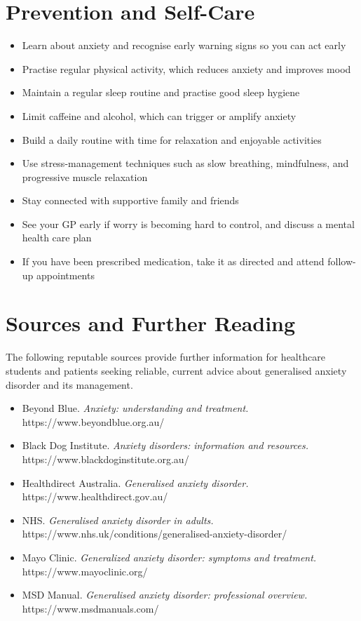 \section*{Prevention and Self-Care}
\begin{itemize}
    \item Learn about anxiety and recognise early warning signs so you can act early
    \item Practise regular physical activity, which reduces anxiety and improves mood
    \item Maintain a regular sleep routine and practise good sleep hygiene
    \item Limit caffeine and alcohol, which can trigger or amplify anxiety
    \item Build a daily routine with time for relaxation and enjoyable activities
    \item Use stress-management techniques such as slow breathing, mindfulness, and progressive muscle relaxation
    \item Stay connected with supportive family and friends
    \item See your GP early if worry is becoming hard to control, and discuss a mental health care plan
    \item If you have been prescribed medication, take it as directed and attend follow-up appointments
\end{itemize}

\section*{Sources and Further Reading}
The following reputable sources provide further information for healthcare students and patients seeking reliable, current advice about generalised anxiety disorder and its management.

\begin{itemize}
    \item Beyond Blue. \textit{Anxiety: understanding and treatment.} https://www.beyondblue.org.au/
    \item Black Dog Institute. \textit{Anxiety disorders: information and resources.} https://www.blackdoginstitute.org.au/
    \item Healthdirect Australia. \textit{Generalised anxiety disorder.} https://www.healthdirect.gov.au/
    \item NHS. \textit{Generalised anxiety disorder in adults.} https://www.nhs.uk/conditions/generalised-anxiety-disorder/
    \item Mayo Clinic. \textit{Generalized anxiety disorder: symptoms and treatment.} https://www.mayoclinic.org/
    \item MSD Manual. \textit{Generalised anxiety disorder: professional overview.} https://www.msdmanuals.com/
\end{itemize}
